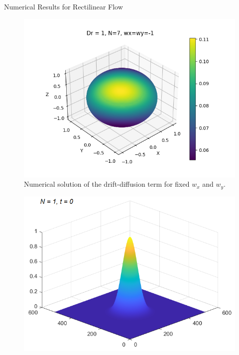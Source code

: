 \begin{frame}{Numerical Results for Rectilinear Flow}
\begin{figure}[H]
\begin{minipage}{0.4\textwidth}
				\includegraphics[scale=0.23]{Bilder_wxwy/Sol_onSphere_wx=-1=wy_Dr=1_N=7}
			\end{minipage}
			\caption{Numerical solution of the drift-diffusion term for fixed $w_x$ and $w_y$.}
		\end{figure}
		\begin{figure}[H]
			\centering
			\begin{minipage}{0.4\textwidth}
				\includegraphics[scale=0.23]{Bilder_wxwy/t=0_wxwy=1_wxwy=-1}
			\end{minipage}
			\hfill 
			\begin{minipage}{0.4\textwidth}

\end{minipage}
\end{figure}
\end{frame}
